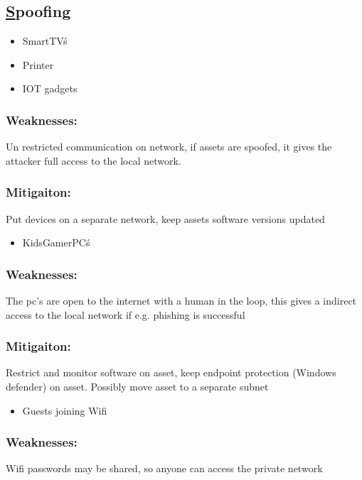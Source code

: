 \documentclass[
	letterpaper, %
	10pt, %
	unnumberedsections, %
	twoside, %
]{APAAssignment}
\begin{document}
\begin{singlespace}
\subsection{\underline{S}poofing}


\begin{itemize}
	\item SmartTV\'s
	\item Printer 
	\item IOT gadgets 
\end{itemize}

\subsubsection{Weaknesses:} Un restricted communication on network, if assets are spoofed, it gives the attacker full access to the local network.
\subsubsection{Mitigaiton:} Put devices on a separate network, keep assets software versions updated

\begin{itemize}
	\item KidsGamerPC\'s
\end{itemize}

\subsubsection{Weaknesses:} The pc's are open to the internet with a human in the loop, this gives a indirect access to the local network if e.g. phishing is successful
\subsubsection{Mitigaiton:} Restrict and monitor software on asset, keep endpoint protection (Windows defender) on asset. Possibly move asset to a separate subnet

\begin{itemize}
	\item Guests joining Wifi
\end{itemize}

\subsubsection{Weaknesses:} Wifi passwords may be shared, so anyone can access the private network

\end{singlespace}
\end{document}
